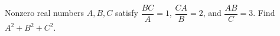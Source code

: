 Nonzero real numbers $A,B,C$ satisfy $\dfrac{BC}{A}=1$, $\dfrac{CA}{B}=2$, and $\dfrac{AB}{C}=3$. Find $A^2+B^2+C^2$.
